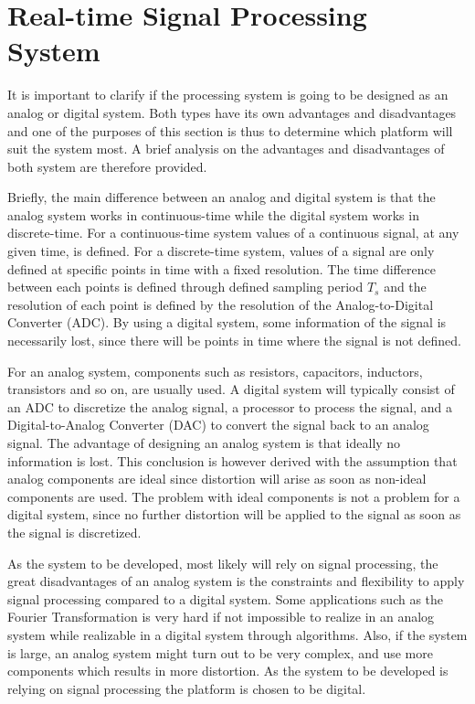 \section{Real-time Signal Processing System}

It is important to clarify if the processing system is going to be designed as an analog or digital system. Both types have its own advantages and disadvantages and one of the purposes of this section is thus to determine which platform will suit the system most. A brief analysis on the advantages and disadvantages of both system are therefore provided. 

Briefly, the main difference between an analog and digital system is that the analog system works in continuous-time while the digital system works in discrete-time. For a continuous-time system values of a continuous signal, at any given time, is defined. For a discrete-time system, values of a signal are only defined at specific points in time with a fixed resolution. The time difference between each points is defined through defined sampling period $T_s$ and the resolution of each point is defined by the resolution of the Analog-to-Digital Converter (ADC). By using a digital system, some information of the signal is necessarily lost, since there will be points in time where the signal is not defined.

For an analog system, components such as resistors, capacitors, inductors, transistors and so on, are usually used. A digital system will typically consist of an ADC to discretize the analog signal, a processor to process the signal, and a Digital-to-Analog Converter (DAC) to convert the signal back to an analog signal. The advantage of designing an analog system is that ideally no information is lost. This conclusion is however derived with the assumption that analog components are ideal since distortion will arise as soon as non-ideal components are used. The problem with ideal components is not a problem for a digital system, since no further distortion will be applied to the signal as soon as the signal is discretized.

As the system to be developed, most likely will rely on signal processing, the great disadvantages of an analog system is the constraints and flexibility to apply signal processing compared to a digital system. Some applications such as the Fourier Transformation is very hard if not impossible to realize in an analog system while realizable in a digital system through algorithms. Also, if the system is large, an analog system might turn out to be very complex, and use more components which results in more distortion. As the system to be developed is relying on signal processing the platform is chosen to be digital.

